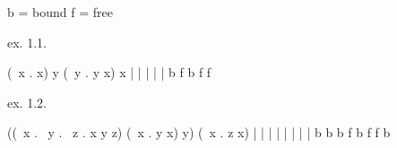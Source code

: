 b = bound
f = free

ex. 1.1.

(\ x . x) y (\ y . y x) x
       |  |        | |  | 
       b  f        b f  f
         
ex. 1.2.

((\ x . \ y . \ z .  x y z) (\ x .  y x) y) (\ x . z x)
                     | | |          | |  |         | |
                     b b b          f b  f         f b